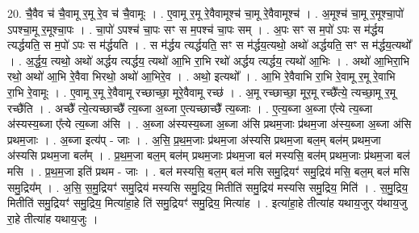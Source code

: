 \documentclass[17pt]{extarticle}
\begin{document}
20. चै॒वैव च॑ चै॒वामू र॒मू रे॒व च॑ चै॒वामूः । . ए॒वामू र॒मू रे॒वैवामूश्च॑ चा॒मू रे॒वैवामूश्च॑ । . अ॒मूश्च॑ चा॒मू र॒मूश्चा॒पो॑ ऽपश्चा॒मू र॒मूश्चा॒पः । . चा॒पो॑ ऽपश्च॑ चा॒पः सꣳ स म॒पश्च॑ चा॒पः सम् । . अ॒पः सꣳ स म॒पो॑ ऽपः स म॑र्द्धय त्यर्द्धयति॒ स म॒पो॑ ऽपः स म॑र्द्धयति । . स म॑र्द्धय त्यर्द्धयति॒ सꣳ स म॑र्द्धय॒त्यथो॒ अथो॑ अर्द्धयति॒ सꣳ स म॑र्द्धय॒त्यथो᳚ । . अ॒र्द्ध॒य॒ त्यथो॒ अथो॑ अर्द्धय त्यर्द्धय॒ त्यथो॑ आ॒भि रा॒भि रथो॑ अर्द्धय त्यर्द्धय॒ त्यथो॑ आ॒भिः । . अथो॑ आ॒भिरा॒भि रथो॒ अथो॑ आ॒भि रे॒वैवा भिरथो॒ अथो॑ आ॒भिरे॒व । . अथो॒ इत्यथो᳚ । . आ॒भि रे॒वैवाभि रा॒भि रे॒वामू र॒मू रे॒वाभि रा॒भि रे॒वामूः । . ए॒वामू र॒मू रे॒वैवामू रच्छाच्छा॒ मूरे॒वैवामू रच्छ॑ । . अ॒मू रच्छाच्छा॒ मूर॒मू रच्छै᳚त्ये॒ त्यच्छा॒मू र॒मू रच्छै॑ति । . अच्छै᳚ त्ये॒त्यच्छाच्छै᳚ त्य॒ब्जा अ॒ब्जा ए॒त्यच्छाच्छै᳚ त्य॒ब्जाः । . ए॒त्य॒ब्जा अ॒ब्जा ए᳚त्ये त्य॒ब्जा अ॑स्यस्य॒ब्जा ए᳚त्ये त्य॒ब्जा अ॑सि । . अ॒ब्जा अ॑स्यस्य॒ब्जा अ॒ब्जा अ॑सि प्रथम॒जाः प्र॑थम॒जा अ॑स्य॒ब्जा अ॒ब्जा अ॑सि प्रथम॒जाः । . अ॒ब्जा इत्य॑प् - जाः । . अ॒सि॒ प्र॒थ॒म॒जाः प्र॑थम॒जा अ॑स्यसि प्रथम॒जा बल॒म् बल॑म् प्रथम॒जा अ॑स्यसि प्रथम॒जा बल᳚म् । . प्र॒थ॒म॒जा बल॒म् बल॑म् प्रथम॒जाः प्र॑थम॒जा बल॑ मस्यसि॒ बल॑म् प्रथम॒जाः प्र॑थम॒जा बल॑ मसि । . प्र॒थ॒म॒जा इति॑ प्रथम - जाः । . बल॑ मस्यसि॒ बल॒म् बल॑ मसि समु॒द्रियꣳ॑ समु॒द्रिय॑ मसि॒ बल॒म् बल॑ मसि समु॒द्रिय᳚म् । . अ॒सि॒ स॒मु॒द्रियꣳ॑ समु॒द्रिय॑ मस्यसि समु॒द्रिय॒ मितीति॑ समु॒द्रिय॑ मस्यसि समु॒द्रिय॒ मिति॑ । . स॒मु॒द्रिय॒ मितीति॑ समु॒द्रियꣳ॑ समु॒द्रिय॒ मित्या॑हा॒हे ति॑ समु॒द्रियꣳ॑ समु॒द्रिय॒ मित्या॑ह । . इत्या॑हा॒हे तीत्या॑ह यथाय॒जुर् य॑थाय॒जु रा॒हे तीत्या॑ह यथाय॒जुः । \newline
\end{document}
